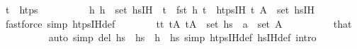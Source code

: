 \begin{isabellebody}
\ {\isachardoublequoteopen}t{\isacharprime}{\kern0pt}{\isacharprime}{\kern0pt}\ {\isasymnotin}\ htps{\isachardoublequoteclose}\isanewline
\ \ \ \ \ \ \ \ \isamarkupfalse%
\ {\isacartoucheopen}{\isasymAnd}h{\isacharprime}{\kern0pt}{\isachardot}{\kern0pt}\ h{\isacharprime}{\kern0pt}\ {\isasymin}\ set\ {\isacharparenleft}{\kern0pt}hs{\isacharunderscore}{\kern0pt}IH{\isacharparenright}{\kern0pt}\ {\isasymLongrightarrow}\ t\ {\isasymnoteq}\ fst\ h{\isacharprime}{\kern0pt}{\isacartoucheclose}\ {\isacartoucheopen}t{\isacharprime}{\kern0pt}{\isacharprime}{\kern0pt}\ {\isasymnotin}\ htps{\isacharunderscore}{\kern0pt}IH{\isacartoucheclose}\ {\isacartoucheopen}{\isacharparenleft}{\kern0pt}t{\isacharprime}{\kern0pt}{\isacharprime}{\kern0pt}{\isacharcomma}{\kern0pt}\ A{\isacharprime}{\kern0pt}{\isacharprime}{\kern0pt}{\isacharparenright}{\kern0pt}\ {\isasymin}\ set\ hs{\isacharunderscore}{\kern0pt}IH{\isacartoucheclose}\isanewline
\ \ \ \ \ \ \ \ \isamarkupfalse%
\ {\isacharparenleft}{\kern0pt}fastforce\ simp{\isacharcolon}{\kern0pt}\ htps{\isacharunderscore}{\kern0pt}IH{\isacharunderscore}{\kern0pt}def{\isacharparenright}{\kern0pt}\isanewline
\ \ \ \ \ \ \isamarkupfalse%
\ {\isachardoublequoteopen}{\isasymexists}t{\isacharprime}{\kern0pt}{\isasymin}{\isacharbraceleft}{\kern0pt}t\ tA{\isacharprime}{\kern0pt}{\isachardot}{\kern0pt}\ {\isacharparenleft}{\kern0pt}t{\isacharprime}{\kern0pt}{\isacharcomma}{\kern0pt}A{\isacharprime}{\kern0pt}{\isacharparenright}{\kern0pt}\ {\isasymin}\ set\ hs{\isacharprime}{\kern0pt}\ {\isasymand}\ a\ {\isasymin}\ set\ A{\isacharprime}{\kern0pt}{\isachardoublequoteclose}\isanewline
\ \ \ \ \ \ \ \ \isamarkupfalse%
\ that\isanewline
\ \ \ \ \ \ \ \ \isamarkupfalse%
\ {\isacharparenleft}{\kern0pt}auto\ simp\ del{\isacharcolon}{\kern0pt}\ {\isacartoucheopen}hs{\isacharprime}{\kern0pt}\ {\isacharequal}{\kern0pt}\ hs{}{\isacharprime}{\kern0pt}\ {\isacharat}{\kern0pt}\ h{\isacharprime}{\kern0pt}\ {\isacharhash}{\kern0pt}\ hs{}{\isacharprime}{\kern0pt}{\isacartoucheclose}\ simp{\isacharcolon}{\kern0pt}\ htps{\isacharunderscore}{\kern0pt}IH{\isacharunderscore}{\kern0pt}def\ hs{\isacharunderscore}{\kern0pt}IH{\isacharunderscore}{\kern0pt}def\ intro{\isacharbang}{\kern0pt}{\isacharcolon}{\kern0pt}\ {}{\isacharparenleft}{\kern0pt}{}{}{\isacharparenright}{\kern0pt}{\isacharparenright}{\kern0pt}\isanewline

\end{isabellebody}
